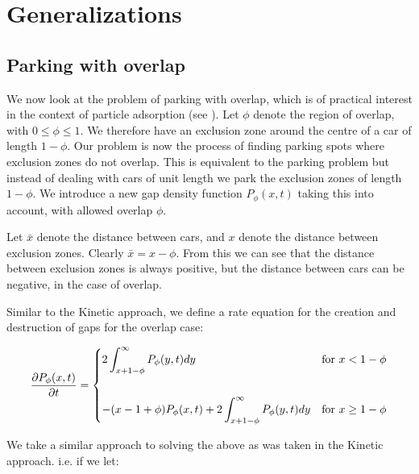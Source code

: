 
\chapter{Generalizations}











\section{Parking with overlap}

We now look at the problem of parking with overlap, which is of practical 
interest in the context of particle adsorption (see \cite{roach2000parking}). 
Let $\phi$ denote the region of overlap, with $0 \leq \phi \leq 1$. We 
therefore have an exclusion zone around the centre of a car of length 
$1 - \phi$. Our problem is now the process of finding parking spots where 
exclusion zones do not overlap. This is equivalent to the parking problem 
but instead of dealing with cars of unit length we park the exclusion zones 
of length $1 - \phi$. We introduce a new gap density function 
$P_{\phi}(x, t)$ taking this into account, with allowed overlap $\phi$. \bigskip

Let $\bar{x}$ denote the distance between cars, and $x$ denote the distance 
between exclusion zones. Clearly $\bar{x} = x - \phi$. From this we can see 
that the distance between exclusion zones is always positive, but the distance 
between cars can be negative, in the case of overlap. \bigskip

Similar to the Kinetic approach, we define a rate equation for the creation and 
destruction of gaps for the overlap case: \bigskip

\begin{eqnarray*}
	\frac{\partial P_{\phi}(x, t)}{\partial t} = 
	\begin{dcases}
		2 \int_{x + 1 - \phi}^{\infty} P_{\phi}(y, t) dy                                   & \text{for } x < 1 - \phi \\\\
		-(x - 1 + \phi) P_{\phi}(x, t) + 2 \int_{x + 1 - \phi}^{\infty} P_{\phi}(y, t) dy  & \text{for } x \geq 1 - \phi
	\end{dcases}
\end{eqnarray*}\medskip

We take a similar approach to solving the above as was taken in the Kinetic 
approach. i.e. if we let: \bigskip

